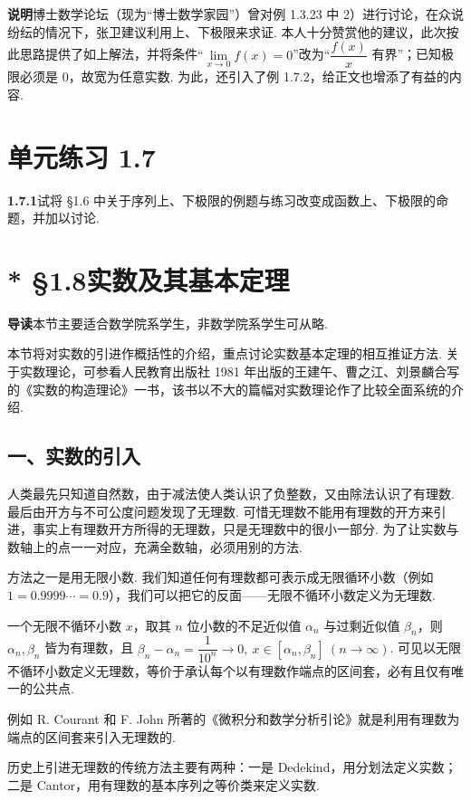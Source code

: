 \documentclass[UTF8, 12pt, fontset=fandol, oneside]{ctexart}
\begin{document}
\noindent\textbf{说明}\quad 博士数学论坛（现为“博士数学家园”）曾对例 1.3.23 中 2）进行讨论，在众说纷纭的情况下，张卫建议利用上、下极限来求证. 本人十分赞赏他的建议，此次按此思路提供了如上解法，并将条件“$\lim\limits_{x\to0}f(x)=0$”改为“$\dfrac{f(x)}x$ 有界”；已知极限必须是 0，故宽为任意实数. 为此，还引入了例 1.7.2，给正文也增添了有益的内容.

\section*{单元练习 1.7}

\noindent\textbf{1.7.1}\quad 试将 §1.6 中关于序列上、下极限的例题与练习改变成函数上、下极限的命题，并加以讨论.

\section*{* §1.8\quad 实数及其基本定理}

\noindent\textbf{导读}\quad 本节主要适合数学院系学生，非数学院系学生可从略.

本节将对实数的引进作概括性的介绍，重点讨论实数基本定理的相互推证方法. 关于实数理论，可参看人民教育出版社 1981 年出版的王建午、曹之江、刘景麟合写的《实数的构造理论》一书，该书以不大的篇幅对实数理论作了比较全面系统的介绍.

\subsection*{一、实数的引入}

人类最先只知道自然数，由于减法使人类认识了负整数，又由除法认识了有理数. 最后由开方与不可公度问题发现了无理数. 可惜无理数不能用有理数的开方来引进，事实上有理数开方所得的无理数，只是无理数中的很小一部分. 为了让实数与数轴上的点一一对应，充满全数轴，必须用别的方法.

方法之一是用无限小数. 我们知道任何有理数都可表示成无限循环小数（例如 $1=0.9999\cdots=0.\dot9$），我们可以把它的反面——无限不循环小数定义为无理数.

一个无限不循环小数 $x$，取其 $n$ 位小数的不足近似值 $\alpha_n$ 与过剩近似值 $\beta_n$，则 $\alpha_n,\beta_n$ 皆为有理数，且 $\beta_n-\alpha_n=\dfrac1{10^n}\to0,\ x\in[\alpha_n,\beta_n]\ (n\to\infty)$. 可见以无限不循环小数定义无理数，等价于承认每个以有理数作端点的区间套，必有且仅有唯一的公共点.

例如 R. Courant 和 F. John 所著的《微积分和数学分析引论》就是利用有理数为端点的区间套来引入无理数的.

历史上引进无理数的传统方法主要有两种：一是 Dedekind，用分划法定义实数；二是 Cantor，用有理数的基本序列之等价类来定义实数.
\end{document}
